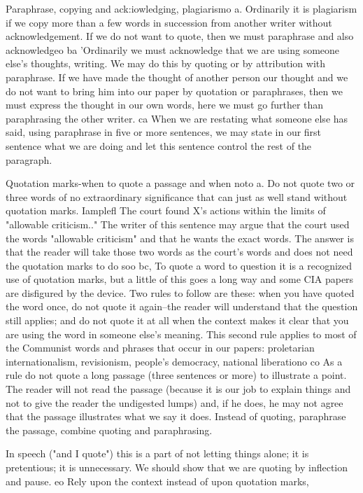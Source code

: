 \documentclass[
    oneside,
    11pt,
    draft
]{memoir}
\begin{document}
Paraphrase, copying and ack:iowledging, plagiarismo a. Ordinarily it is plagiarism if we copy more than a few words in succession from another writer without acknowledgement. If we do not want to quote, then we must paraphrase and also acknowledgeo ba 'Ordinarily we must acknowledge that we are using someone else's thoughts, writing. We may do this by quoting or by attribution with paraphrase. If we have made the thought of another person our thought and we do not want to bring him into our paper by quotation or paraphrases, then we must express the thought in our own words, here we must go further than paraphrasing the other writer. ca When we are restating what someone else has said, using paraphrase in five or more sentences, we may state in our first sentence what we are doing and let this sentence control the rest of the paragraph. 

Quotation marks-when to quote a passage and when noto a. Do not quote two or three words of no extraordinary significance that can just as well stand without quotation marks. Iamplefl The court found X's actions within the limits of "allowable criticism.." The writer of this sentence may argue that the court used the words "allowable criticism" and that he wants the exact words. The answer is that the reader will take those two words as the court's words and does not need the quotation marks to do soo bc, To quote a word to question it is a recognized use of quotation marks, but a little of this goes a long way and some CIA papers are disfigured by the device. Two rules to follow are these: when you have quoted the word once, do not quote it again--the reader will understand that the question still applies; and do not quote it at all when the context makes it clear that you are using the word in someone else's meaning. This second rule applies to most of the Communist words and phrases that occur in our papers: proletarian internationalism, revisionism, people's democracy, national liberationo co As a rule do not quote a long passage (three sentences or more) to illustrate a point. The reader will not read the passage (because it is our job to explain things and not to give the reader the undigested lumps) and, if he does, he may not agree that the passage illustrates what we say it does. Instead of quoting, paraphrase the passage, combine quoting and paraphrasing.

In speech ("and I quote") this is a part of not letting things alone; it is pretentious; it is unnecessary. We should show that we are quoting by inflection and pause. eo Rely upon the context instead of upon quotation marks, 
\end{document}
